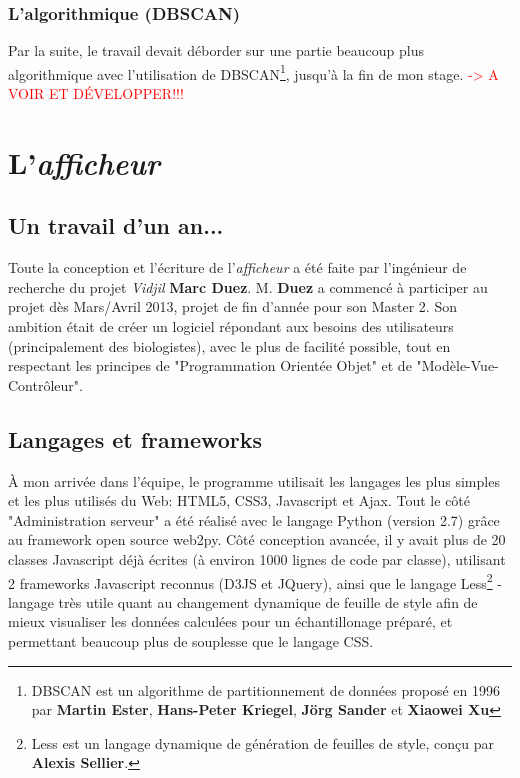 \documentclass{report}
\begin{document}
\subsection{L'algorithmique (DBSCAN)}
Par la suite, le travail devait déborder sur une partie beaucoup plus algorithmique avec l'utilisation de DBSCAN\footnote{DBSCAN est un algorithme de partitionnement de données proposé en 1996 par \textbf{Martin Ester}, \textbf{Hans-Peter Kriegel}, \textbf{Jörg Sander} et \textbf{Xiaowei Xu}}, jusqu'à la fin de mon stage.
\newline
\textcolor{red}{-> A VOIR ET DÉVELOPPER!!!}


\chapter{L'\textit{afficheur}}

\section{Un travail d'un an...}
Toute la conception et l'écriture de l'\textit{afficheur} a été faite par l'ingénieur de recherche du projet \textit{Vidjil} \textbf{Marc Duez}.
\newline
M. \textbf{Duez} a commencé à participer au projet dès Mars/Avril 2013, projet de fin d'année pour son Master 2.
\newline
Son ambition était de créer un logiciel répondant aux besoins des utilisateurs (principalement des biologistes), avec le plus de facilité possible, tout en respectant les principes de "Programmation Orientée Objet" et de "Modèle-Vue-Contrôleur".

\section{Langages et frameworks}
À mon arrivée dans l'équipe, le programme utilisait les langages les plus simples et les plus utilisés du Web: HTML5, CSS3, Javascript et Ajax.
\newline
Tout le côté "Administration serveur" a été réalisé avec le langage Python (version 2.7) grâce au framework open source web2py.
\newline
Côté conception avancée, il y avait plus de 20 classes Javascript déjà écrites (à environ 1000 lignes de code par classe), utilisant 2 frameworks Javascript reconnus (D3JS et JQuery), ainsi que le langage Less\footnote{Less est un langage dynamique de génération de feuilles de style, conçu par \textbf{Alexis Sellier}.} - langage très utile quant au changement dynamique de feuille de style afin de mieux visualiser les données calculées pour un échantillonage préparé, et permettant beaucoup plus de souplesse que le langage CSS.
\end{document}

